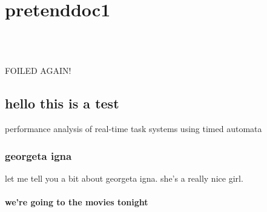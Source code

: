 \chapter{pretenddoc1}
\label{pretenddoc1}

\quad\\

\quad\\

\newpage

\noindent FOILED AGAIN!

\section{hello this is a test}
performance analysis of real-time task systems using timed automata

\subsection{georgeta igna}
let me tell you a bit about georgeta igna. she's a really nice girl.

\subsubsection{we're going to the movies tonight}